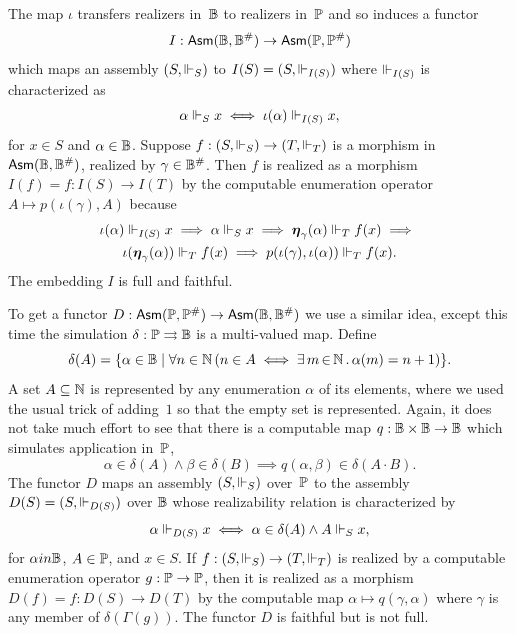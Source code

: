 The map $\iota$ transfers realizers in~$\mathbb{B}$ to realizers
in~$\mathbb{P}$ and so induces a functor
%
\begin{equation*}
  I : \mathsf{Asm}(\mathbb{B}, \mathbb{B}^{\#}) \to \mathsf{Asm}(\mathbb{P}, \mathbb{P}^{\#})
\end{equation*}
%
which maps an assembly $(S, {\Vdash_S})$ to $I(S) = (S, {\Vdash_{I(S)}})$
where $\Vdash_{I(S)}$ is characterized as
%
\begin{equation*}
  \alpha \Vdash_S x \iff
  \iota(\alpha) \Vdash_{I(S)} x,
\end{equation*}
%
for $x \in S$ and $\alpha \in \mathbb{B}$.
%
Suppose $f : (S, {\Vdash_S}) \to (T, {\Vdash_T})$ is a morphism in
$\mathsf{Asm}(\mathbb{B}, \mathbb{B}^{\#})$, realized by $\gamma \in \mathbb{B}^{\#}$.
Then $f$ is realized as a morphism $I(f) = f : I(S) \to I(T)$ by the
computable enumeration operator $A \mapsto p(\iota(\gamma), A)$
because
%
\begin{multline*}
  \iota(\alpha) \Vdash_{I(S)} x \implies
  \alpha \Vdash_S x \implies
  \text{\boldmath{$\eta$}}_{\gamma}(\alpha) \Vdash_T f(x) \implies {}\\
  \iota(\text{\boldmath{$\eta$}}_{\gamma}(\alpha)) \Vdash_T f(x) \implies
  p(\iota(\gamma), \iota(\alpha)) \Vdash_T f(x).
\end{multline*}
%
The embedding $I$ is full and faithful.

To get a functor $D : \mathsf{Asm}(\mathbb{P}, \mathbb{P}^{\#}) \to \mathsf{Asm}(\mathbb{B},
  \mathbb{B}^{\#})$ we use a similar idea, except this time the
simulation $\delta : \mathbb{P} \rightrightarrows \mathbb{B}$ is a multi-valued map.
Define
%
\begin{equation*}
  \delta(A) = \{\alpha \in \mathbb{B} \mid
    \forall n \in \mathbb{N} \, (n \in A \iff \exists\, m \,{\in}\, \mathbb{N}\,.\,\alpha(m) = n + 1)
  \}.
\end{equation*}
%
A set $A \subseteq \mathbb{N}$ is represented by any enumeration $\alpha$ of
its elements, where we used the usual trick of adding~$1$ so that the
empty set is represented. Again, it does not take much effort to see
that there is a computable map $q : \mathbb{B} \times \mathbb{B} \to \mathbb{B}$
which simulates application in~$\mathbb{P}$,
%
\begin{equation*}
  \alpha \in \delta(A) \land
  \beta \in \delta(B) \implies q(\alpha, \beta) \in \delta(A \cdot B).
\end{equation*}
%
The functor $D$ maps an assembly $(S, {\Vdash_S})$ over~$\mathbb{P}$ to the
assembly $D(S) = (S, {\Vdash_{D(S)}})$ over $\mathbb{B}$ whose realizability
relation is characterized by
%
\begin{equation*}
  \alpha \Vdash_{D(S)} x \iff
  \alpha \in \delta(A) \land A \Vdash_S x,
\end{equation*}
%
for $\alpha in \mathbb{B}$, $A \in \mathbb{P}$, and $x \in S$. If $f : (S,
{\Vdash_S}) \to (T, {\Vdash_T})$ is realized by a computable enumeration
operator $g : \mathbb{P} \to \mathbb{P}$, then it is realized as a morphism
$D(f) = f : D(S) \to D(T)$ by the computable map $\alpha \mapsto
q(\gamma, \alpha)$ where $\gamma$ is any member of
$\delta(\Gamma(g))$. The functor $D$ is faithful but is not full.


